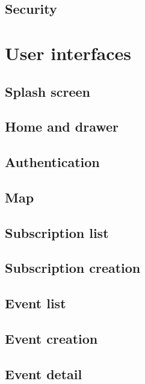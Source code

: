 \documentclass[a4paper]{scrreprt}
\begin{document}
\section{Security}


\chapter{User interfaces}

\section{Splash screen}

\section{Home and drawer}

\section{Authentication}

\section{Map}

\section{Subscription list}

\section{Subscription creation}

\section{Event list}

\section{Event creation}

\section{Event detail}


\end{document}
